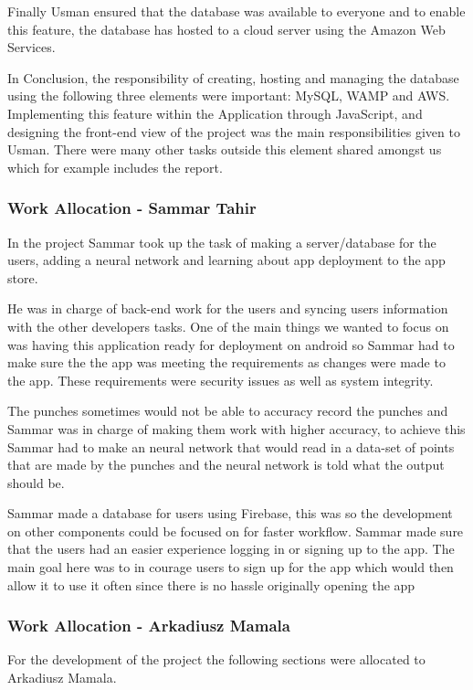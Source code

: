 \documentclass[a4paper,12pt]{report}
\begin{document}
Finally Usman ensured that the database was available to everyone and to enable this feature, the database has hosted to a cloud server using the Amazon Web Services.

In Conclusion, the responsibility of creating, hosting and managing the database using the following three elements were important: MySQL, WAMP and AWS. Implementing this feature within the Application through JavaScript, and designing the front-end view of the project was the main responsibilities given to Usman. There were many other tasks outside this element shared amongst us which for example includes the report.

\newpage
\subsubsection{Work Allocation - Sammar Tahir}
In the project Sammar took up the task of making a server/database for the users, adding a neural network and learning about app deployment to the app store.

He was in charge of back-end work for the users and syncing users information with the other developers tasks. One of the main things we wanted to focus on was having this application ready for deployment on android so Sammar had to make sure the the app was meeting the requirements as changes were made to the app. These requirements were security issues as well as system integrity.

The punches sometimes would not be able to accuracy record the punches and Sammar was in charge of making them work with higher accuracy, to achieve this Sammar had to make an neural network that would read in a data-set of points that are made by the punches and the neural network is told what the output should be.

Sammar made a database for users using Firebase, this was so the development on other components could be focused on for faster workflow. Sammar made sure that the users had an easier experience logging in or signing up to the app. The main goal here was to in courage users to sign up for the app which would then allow it to use it often since there is no hassle originally opening the app
\newpage
\subsubsection{Work Allocation - Arkadiusz Mamala}
For the development of the project the following sections were allocated to Arkadiusz Mamala.
\end{document}

